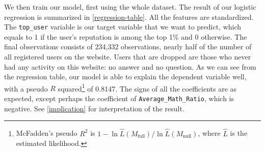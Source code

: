 \documentclass[12pt]{article}
\begin{document}
We then train our model, first using the whole dataset. The result of our logistic regression is summarized in \cref{regression-table}. All the features are standardized. The \lstinline!top_user! variable is our target variable that we want to predict, which equals to 1 if the user's reputation is among the top 1\% and 0 otherwise. The final observations consists of 234,332 observations, nearly half of the number of all registered users on the website. Users that are dropped are those who never had any activity on this website: no answer and no question. As we can see from the regression table, our model is able to explain the dependent variable well, with a pseudo $R$ squared\footnote{McFadden’s pseudo $R^2$ is $1-\ln\hat{L}(M_{\mathrm{full}})/\ln\hat{L}(M_{\mathrm{null}})$, where $\hat{L}$ is the estimated likelihood.} of 0.8147. The signs of all the coefficients are as expected, except perhaps the coefficient of \lstinline!Average_Math_Ratio!, which is negative. See \cref{implication} for interpretation of the result.
\end{document}
